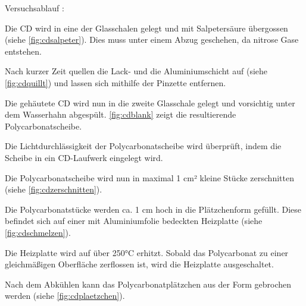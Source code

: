Versuchsablauf \cite{cdversuch}:
\begin{enumerate*}
    \item Die CD wird in eine der Glasschalen gelegt und mit Salpetersäure übergossen (siehe \autoref{fig:cdsalpeter}). Dies muss unter einem Abzug geschehen, da nitrose Gase entstehen.
    \item Nach kurzer Zeit \glqq quellen\grqq{} die Lack- und die Aluminiumschicht auf (siehe \autoref{fig:cdquillt}) und lassen sich mithilfe der Pinzette entfernen.
    \item Die \glqq gehäutete\grqq{} CD wird nun in die zweite Glasschale gelegt und vorsichtig unter dem Wasserhahn abgespült. \autoref{fig:cdblank} zeigt die resultierende Polycarbonatscheibe.
    \item Die Lichtdurchlässigkeit der Polycarbonatscheibe wird überprüft, indem die Scheibe in ein CD-Laufwerk eingelegt wird.
    \item Die Polycarbonatscheibe wird nun in maximal 1 cm² kleine Stücke zerschnitten (siehe \autoref{fig:cdzerschnitten}).
    \item Die Polycarbonatstücke werden ca. 1 cm hoch in die Plätzchenform gefüllt. Diese befindet sich auf einer mit Aluminiumfolie bedeckten Heizplatte (siehe \autoref{fig:cdschmelzen}).
    \item Die Heizplatte wird auf über 250°C erhitzt. Sobald das Polycarbonat zu einer gleichmäßigen Oberfläche zerflossen ist, wird die Heizplatte ausgeschaltet.
    \item Nach dem Abkühlen kann das \glqq Polycarbonatplätzchen\grqq{} aus der Form gebrochen werden (siehe \autoref{fig:cdplaetzchen}).
\end{enumerate*}

